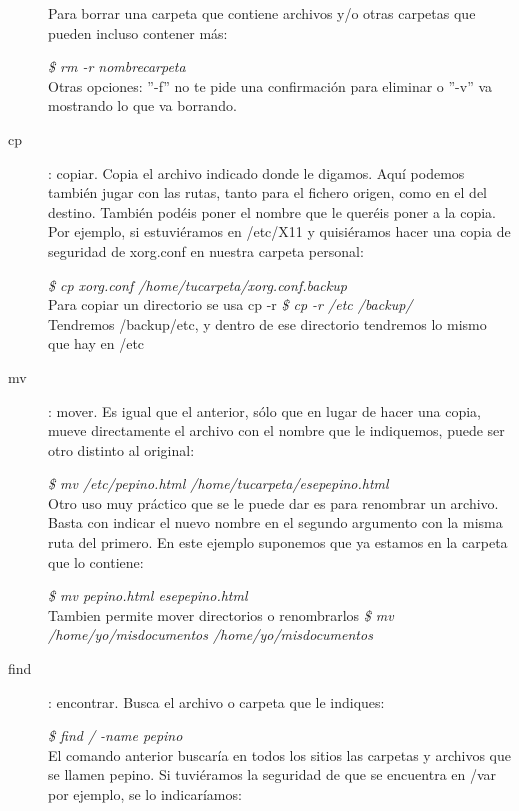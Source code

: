 \documentclass[12pt,spanish,lettersize,twocolumn]{article}
\begin{document}
\begin{description}
Para borrar una carpeta que contiene archivos y/o otras carpetas que pueden incluso contener m\'as:

\emph{\$ rm -r nombrecarpeta}\\

Otras opciones: ''-f'' no te pide una confirmaci\'on para eliminar o ''-v'' va mostrando lo que va borrando.

\item[cp]: copiar. Copia el archivo indicado donde le digamos. Aqu\'i podemos tambi\'en jugar con las rutas, tanto para el fichero origen, como en el del destino. Tambi\'en pod\'eis poner el nombre que le quer\'eis poner a la copia. Por ejemplo, si estuvi\'eramos en /etc/X11 y quisi\'eramos hacer una copia de seguridad de xorg.conf en nuestra carpeta personal:

\emph{\$ cp xorg.conf /home/tucarpeta/xorg.conf.backup}\\

Para copiar un directorio se usa cp -r
\emph{\$ cp -r /etc /backup/}\\
Tendremos /backup/etc, y dentro de ese directorio tendremos lo mismo que hay en /etc

\item[mv]: mover. Es igual que el anterior, s\'olo que en lugar de hacer una copia, mueve directamente el archivo con el nombre que le indiquemos, puede ser otro distinto al original:

\emph{\$ mv /etc/pepino.html /home/tucarpeta/esepepino.html}\\

Otro uso muy pr\'actico que se le puede dar es para renombrar un archivo. Basta con indicar el nuevo nombre en el segundo argumento con la misma ruta del primero. En este ejemplo suponemos que ya estamos en la carpeta que lo contiene:

\emph{\$ mv pepino.html esepepino.html}\\

Tambien permite mover directorios o renombrarlos
\emph{\$ mv /home/yo/misdocumentos /home/yo/misdocumentos}\\

\item[find]: encontrar. Busca el archivo o carpeta que le indiques:

\emph{\$ find / -name pepino}\\

El comando anterior buscar\'ia en todos los sitios las carpetas y archivos que se llamen pepino. Si tuvi\'eramos la seguridad de que se encuentra en /var por ejemplo, se lo indicar\'iamos:


\end{description}
\end{document}
